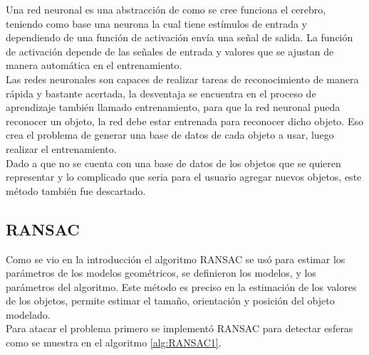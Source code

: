         Una red neuronal es una abstracción de como se cree funciona el cerebro, teniendo como base una neurona la cual tiene estímulos de entrada y dependiendo de una función de activación envía una señal de salida. La función de activación depende de las señales de entrada y valores que se ajustan de manera automática en el entrenamiento.\\
        
        Las redes neuronales son capaces de realizar tareas de reconocimiento de manera rápida y bastante acertada, la desventaja se encuentra en el proceso de aprendizaje también llamado entrenamiento, para que la red neuronal pueda reconocer un objeto, la red debe estar entrenada para reconocer dicho objeto. Eso crea el problema de generar una base de datos de cada objeto a usar, luego realizar el entrenamiento.\\
        
        Dado a que no se cuenta con una base de datos de los objetos que se quieren representar y lo complicado que seria para el usuario agregar nuevos objetos, este método también fue descartado.
        
        
        
        
    
    
    \subsection{RANSAC}
        Como se vio en la introducción el algoritmo RANSAC se usó para estimar los parámetros de los modelos geométricos, se definieron los modelos, y los parámetros del algoritmo. Este método es preciso en la estimación de los valores de los objetos, permite estimar el tamaño, orientación y posición del objeto modelado.  \\ 
        
                
        Para atacar el problema primero se implementó RANSAC para detectar esferas como se muestra en el \gls{algoritmo} \ref{alg:RANSAC1}.\\
               
